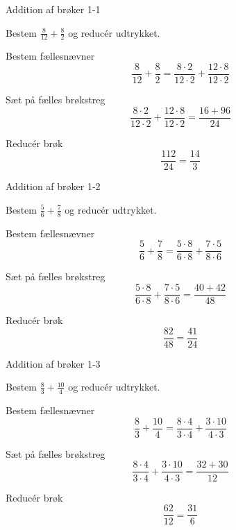 \documentclass{article}
\begin{document}

	\tableofcontents
	\newpage
	
	\begin{exercise}{Addition af brøker 1-1}
		
		Bestem $\frac{8}{12}+\frac{8}{2}$ og reducér udtrykket.
		
		
		\hint
		
		Bestem fællesnævner
		\[
		\frac{8}{12}+\frac{8}{2}  = \frac{8 \cdot 2}{12 \cdot 2}+\frac{12 \cdot 8}{12\cdot 2} 
		\]
		
		\hint
		
		Sæt på fælles brøkstreg
		\[
		\frac{8 \cdot 2}{12 \cdot 2}+\frac{12 \cdot 8}{12\cdot 2} = \frac{16+96}{24} 
		\]
		
		\hint
		
		Reducér brøk
		\[
		\frac{112}{24} = \frac{14}{3}
		\]
		
	\end{exercise}
	
	\newpage
	
	\begin{exercise}{Addition af brøker 1-2}
		
		Bestem $\frac{5}{6}+\frac{7}{8}$ og reducér udtrykket.
		
		
		\hint
		
		Bestem fællesnævner
		\[
		\frac{5}{6}+\frac{7}{8}  = \frac{5 \cdot 8 }{6 \cdot 8}+\frac{7 \cdot 5}{8\cdot 6} 
		\]
		
		\hint
		
		Sæt på fælles brøkstreg
		\[
		\frac{5 \cdot 8 }{6 \cdot 8}+\frac{7 \cdot 5}{8\cdot 6}  = \frac{40+42}{48} 
		\]
		
		\hint
		
		Reducér brøk
		\[
		\frac{82}{48} = \frac{41}{24}
		\]
		
	\end{exercise}
	
	\newpage
	
	\begin{exercise}{Addition af brøker 1-3}
		
		Bestem $\frac{8}{3}+\frac{10}{4}$ og reducér udtrykket.
		
		
		\hint
		
		Bestem fællesnævner
		\[
		\frac{8}{3}+\frac{10}{4}  = \frac{8 \cdot 4 }{3 \cdot 4}+\frac{3 \cdot 10}{4\cdot 3} 
		\]
		
		\hint
		
		Sæt på fælles brøkstreg
		\[
		\frac{8 \cdot 4 }{3 \cdot 4}+\frac{3 \cdot 10}{4\cdot 3}  = \frac{32+30}{12} 
		\]
		
		\hint
		
		Reducér brøk
		\[
		\frac{62}{12} = \frac{31}{6}
		\]
		
	\end{exercise}
	
\end{document}
